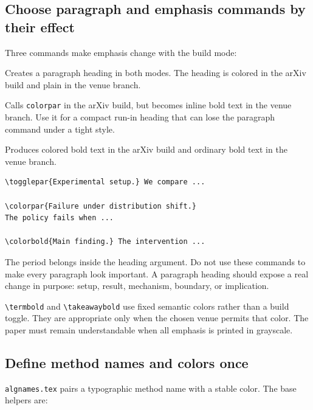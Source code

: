 \subsection{Choose paragraph and emphasis commands by their effect}

Three commands make emphasis change with the build mode:

\begin{description}[leftmargin=*,style=nextline]
    \item[\texttt{\textbackslash colorpar\{Heading.\}}]
    Creates a paragraph heading in both modes. The heading is colored in the
    arXiv build and plain in the venue branch.

    \item[\texttt{\textbackslash togglepar\{Heading.\}}]
    Calls \texttt{colorpar} in the arXiv build, but becomes inline bold text in
    the venue branch. Use it for a compact run-in heading that can lose the
    paragraph command under a tight style.

    \item[\texttt{\textbackslash colorbold\{Text\}}]
    Produces colored bold text in the arXiv build and ordinary bold text in the
    venue branch.
\end{description}

\begin{verbatim}
\togglepar{Experimental setup.} We compare ...

\colorpar{Failure under distribution shift.}
The policy fails when ...

\colorbold{Main finding.} The intervention ...
\end{verbatim}

The period belongs inside the heading argument. Do not use these commands to
make every paragraph look important. A paragraph heading should expose a real
change in purpose: setup, result, mechanism, boundary, or implication.

\texttt{\textbackslash termbold} and
\texttt{\textbackslash takeawaybold} use fixed semantic colors rather than a
build toggle. They are appropriate only when the chosen venue permits that
color. The paper must remain understandable when all emphasis is printed in
grayscale.

\subsection{Define method names and colors once}

\texttt{algnames.tex} pairs a typographic method name with a stable color.
The base helpers are:

